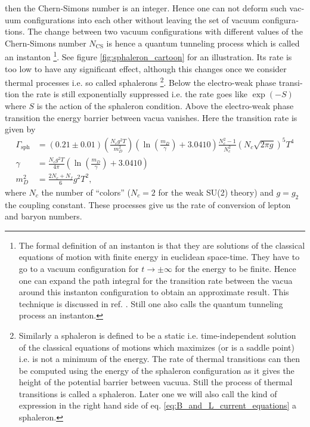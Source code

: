 \documentclass[master,       %
               twoside,        %
               BCOR10mm,       %
               english,ngerman, %
               ]{GAUBM}
\begin{document}
\begin{otherlanguage}{english}
then the Chern-Simons number is an integer.
Hence one can not deform such vacuum configurations into each other without leaving the set of vacuum configurations.
The change between two vacuum configurations with different values of the Chern-Simons number $N_\mathrm{CS}$ is hence a quantum tunneling process which is called an instanton \footnote{
The formal definition of an instanton is that they are solutions of the classical equations of motion with finite energy in euclidean space-time. They have to go to a vacuum configuration for $t \to \pm \infty$ for the energy to be finite. Hence one can expand the path integral for the transition rate between the vacua around this instanton configuration to obtain an approximate result. This technique is discussed in ref. \cite[chap. 7]{aspects_of_symmmetry}. Still one also calls the quantum tunneling process an instanton.
}. See figure \ref{fig:sphaleron_cartoon} for an illustration.
Its rate is too low to have any significant effect, although this changes once we consider thermal processes i.e. so called sphalerons \footnote{
Similarly a sphaleron is defined to be a static i.e. time-independent solution of the classical equations of motions which maximizes (or is a saddle point) i.e. is not a minimum of the energy.
The rate of thermal transitions can then be computed using the energy of the sphaleron configuration as it gives the height of the potential barrier between vacuua.
Still the process of thermal transitions is called a sphaleron. Later one we will also call the kind of expression in the right hand side of eq. \eqref{eq:B_and_L_current_equations} a sphaleron.
}.
Below the electro-weak phase transition the rate is still exponentially suppressed i.e. the rate goes like $\exp(-S)$ where $S$ is the action of the sphaleron condition. Above the electro-weak phase transition the energy barrier between vacua vanishes. Here the transition rate is given by \cite{sphaleron_rate_symmetric_phase_Moore_2011}
\begin{align}
	\Gamma_{\mathrm{sph}} &= (0.21 \pm 0.01) \left(\frac{N_c g^2 T}{m_D^2} \right) \left(\ln \left(\frac{m_D}{\gamma} \right) + 3.0410 \right) \frac{N_c^2 - 1}{N_c^2} (N_c \sqrt{2 \pi g})^5 T^4 \\
	\gamma &= \frac{N_c g^2 T}{4 \pi} \left(\ln \left(\frac{m_D}{\gamma}\right) + 3.0410 \right) \nonumber \\
	m_D^2 &= \frac{2N_c + N_f}{6} g^2 T^2 \nonumber,
\end{align}
where $N_c$ the number of ``colors'' ($N_c = 2$ for the weak SU(2) theory) and $g = g_2$ the coupling constant.
These processes give us the rate of conversion of lepton and baryon numbers.


\end{otherlanguage}
\end{document}
